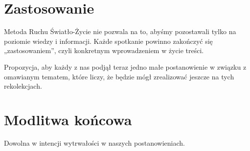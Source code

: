 \documentclass[a5paper,10pt,polish]{book}
\begin{document}
\section{Zastosowanie}
\label{miliardowice-2005-jesien/spotkanie1:zastosowanie}
Metoda Ruchu Światło-Życie nie pozwala na to, abyśmy pozostawali tylko na poziomie wiedzy  i informacji. Każde spotkanie  powinno zakończyć się
„zastosowaniem”, czyli konkretnym wprowadzeniem w życie treści.

Propozycja, aby każdy z nas  podjął  teraz jedno małe postanowienie w związku z omawianym tematem, które liczy, że będzie  mógł zrealizować jeszcze na tych rekolekcjach.


\section{Modlitwa końcowa}
\label{miliardowice-2005-jesien/spotkanie1:modlitwa-koncowa}
Dowolna w intencji wytrwałości w naszych postanowieniach.
\end{document}
